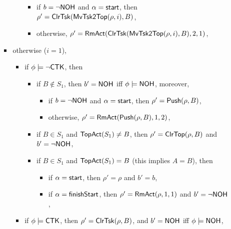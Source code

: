 \begin{itemize}
\begin{itemize}
\begin{itemize}
\begin{itemize}
				\begin{itemize}
						\item if $b = \neg {\sf NOH}$ and $\alpha = {\mathsf{start} }$, then $\rho'=\mathsf{ClrTsk}(\mathsf{MvTsk2Top}(\rho, i), B)$, 
						\item otherwise,  $\rho'= \mathsf{RmAct}(\mathsf{ClrTsk}(\mathsf{MvTsk2Top}(\rho, i), B), 2, 1)$, 
				\end{itemize}
        			\end{itemize}
		\item otherwise ($i = 1$), 
        			\begin{itemize}
            			\item if $\phi \models \neg {\sf CTK}$, then 
            			\begin{itemize}
					\item if $B \not \in S_1$, then $b' = {\sf NOH}$ iff $\phi  \models {\sf NOH}$, moreover, 
					\begin{itemize}
						\item if $b = \neg {\sf NOH}$ and $\alpha = {\mathsf{start} }$, then $\rho'=\mathsf{Push}(\rho, B)$,
						\item otherwise, $\rho' = \mathsf{RmAct}(\mathsf{Push}(\rho, B), 1, 2)$,  
					\end{itemize}
            				\item if $B \in S_1$ and $\mathsf{TopAct}(S_1) \neq B$, then $\rho'= \mathsf{ClrTop}(\rho, B)$ and $b' = \neg{\sf NOH}$,
					\item if $B \in S_1$ and $\mathsf{TopAct}(S_1) = B$ (this implies $A = B$), then 
					\begin{itemize}
						\item if $\alpha = {\mathsf{start} }$, then $\rho' = \rho$ and $b' = b$,
						\item if $\alpha = {\mathsf{finishStart} }$, then $\rho' = \mathsf{RmAct}(\rho, 1, 1)$ and $b' = \neg {\sf NOH}$,
					\end{itemize}
			 	\end{itemize}
            			\item if $\phi \models {\sf CTK}$, then $\rho'= \mathsf{ClrTsk}(\rho, B)$, and $b' = {\sf NOH}$ iff $\phi  \models {\sf NOH}$, 

\end{itemize}
\end{itemize}
\end{itemize}
\end{itemize}
